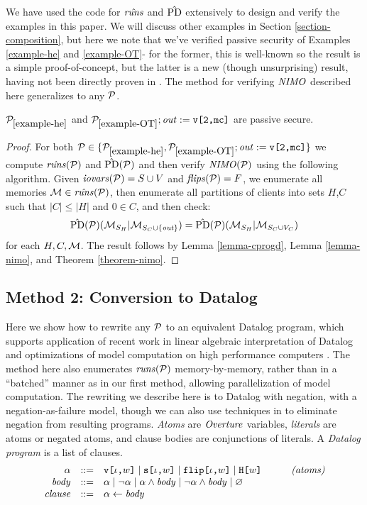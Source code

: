 We have used the code for $\hat{\mathit{runs}}$ and $\hat{\mathrm{PD}}$ extensively to design and
verify the examples in this paper. We will discuss other examples in
Section \ref{section-composition}, but here we note that we've verified
passive security of Examples \ref{example-he} and \ref{example-OT}-
for the former, this is well-known so the result is a simple proof-of-concept,
but the latter is a new (though unsurprising) result, having not been
directly proven in \cite{barthe2019probabilistic}. The method for
verifying $\mathit{NIMO}$ described here generalizes to any $\mathcal{P}$. 
\begin{lemma}
  \label{lemma-bruteforce-nimo}
  $\mathcal{P}_{\ref{example-he}}$ and $\mathcal{P}_{\ref{example-OT}};\mathit{out} := \texttt{v[2,mc]}$ are
  passive secure.
\end{lemma}
\begin{proof}
  For both $\mathcal{P} \in \{
  \mathcal{P}_{\ref{example-he}},\mathcal{P}_{\ref{example-OT}};\mathit{out} := \texttt{v[2,mc]}\}$
  we compute $\hat{\mathit{runs}}(\mathcal{P})$ and $\hat{\mathrm{PD}}(\mathcal{P})$ and then verify
  $\mathit{NIMO}(\mathcal{P})$ using the following algorithm. Given $\mathit{iovars}(\mathcal{P}) = S
  \cup V$ and $\mathit{flips}(\mathcal{P}) = F$, we enumerate all memories $\mathcal{M}
  \in \hat{\mathit{runs}}(\mathcal{P})$, then enumerate all partitions of clients into
  sets $H$,$C$ such that $|C| \le |H|$ and $0 \in C$, and then check:
  $$
  \hat{\mathrm{PD}}(\mathcal{P})(\mathcal{M}_{S_H}|\mathcal{M}_{S_C \cup \{\mathit{out}\}}) =
  \hat{\mathrm{PD}}(\mathcal{P})(\mathcal{M}_{S_H}|\mathcal{M}_{S_C \cup V_C})
  $$
  for each $H,C,\mathcal{M}$. The result follows by Lemma \ref{lemma-cprogd}, Lemma \ref{lemma-nimo}, and
  Theorem \ref{theorem-nimo}.
\end{proof}

\subsection{Method 2: Conversion to Datalog}
\label{section-bruteforce-datalog}

Here we show how to rewrite any $\mathcal{P}$ to an equivalent Datalog
program, which supports application of recent work in linear algebraic
interpretation of Datalog and optimizations of model computation on
high performance computers \cite{sakama2017linear}. The method here also enumerates
$\mathit{runs}(\mathcal{P})$ memory-by-memory, rather than in a ``batched'' manner
as in our first method, allowing parallelization of model
computation. The rewriting we describe here is to Datalog with
negation, with a negation-as-failure model, though we can also
use techniques in \cite{sakama2017linear} to eliminate negation from
resulting programs. \emph{Atoms} are $\mathit{Overture}$ variables, \emph{literals}
are atoms or negated atoms, and clause bodies are conjunctions of literals.
A \emph{Datalog program} is a list of clauses.
$$
\begin{array}{rclr}
  \alpha &::=& \texttt{v[}\iota\texttt{,}w\texttt{]} \mid  \texttt{s[}\iota\texttt{,}w\texttt{]} \mid \texttt{flip[}\iota\texttt{,}w\texttt{]} \mid \texttt{H[}w\texttt{]} & \qquad \textit{(atoms)}\\
  \mathit{body} &::=&  \alpha \mid \neg \alpha \mid \alpha \wedge \mathit{body} \mid \neg\alpha \wedge \mathit{body} \mid \varnothing \\
  \mathit{clause} &::=& \alpha \gets \mathit{body}
\end{array}
$$

